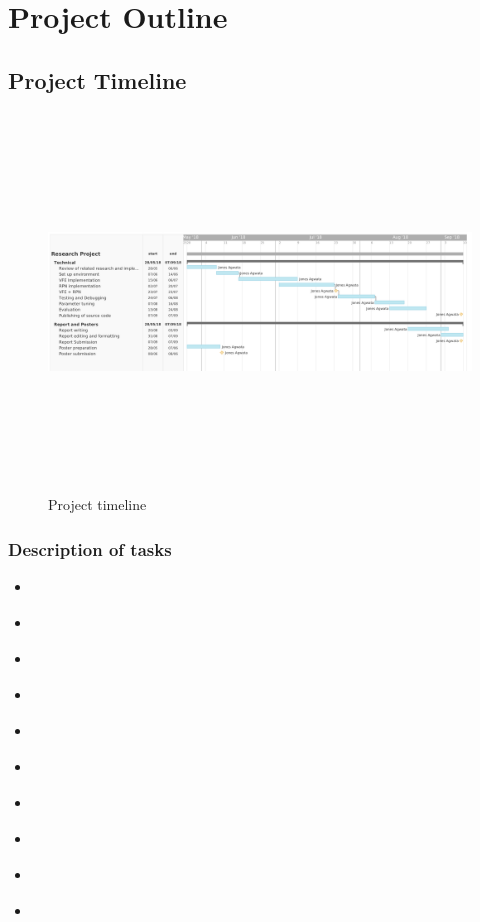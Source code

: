 \let\textcircled=\pgftextcircled
\chapter{Project Outline}
\label{chap:proj_outline}



\section{Project Timeline}
\begin{figure}[h]
    \centering
    \includegraphics[height=10cm,width=\textwidth]{media/timeline.png}
    \caption{Project timeline}
    \label{fig:timeline}
\end{figure}

\subsection{Description of tasks}

\begin{itemize}
    \item \textbf{}
    \item \textbf{}
    \item \textbf{}
    \item \textbf{}
    \item \textbf{}
    \item \textbf{}
    \item \textbf{}
    \item \textbf{}
    \item \textbf{}
    \item \textbf{}
\end{itemize}

